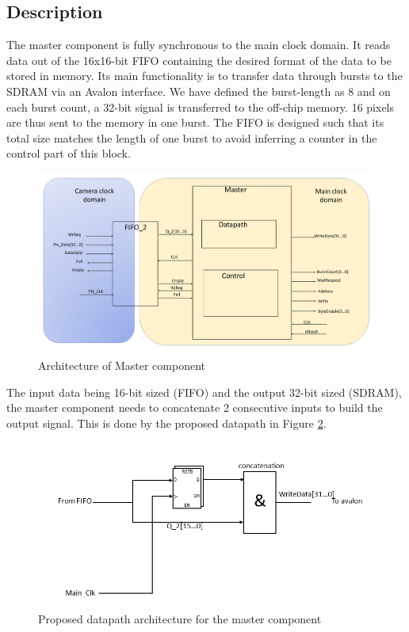 \documentclass{article}
\begin{document}
\subsection{Description}
The master component is fully synchronous to the main clock domain. It reads data out of the 16x16-bit FIFO containing the desired format of the data to be stored in memory. Its main functionality is to transfer data through bursts to the SDRAM via an Avalon interface. We have defined the burst-length as 8 and on each burst count, a 32-bit signal is transferred to the off-chip memory. 16 pixels are thus sent to the memory in one burst. The FIFO is designed such that its total size matches the length of one burst to avoid inferring a counter in the control part of this block. 

\begin{figure}[H]
\centering
\includegraphics[scale=0.23]{master_block_diagram.png}
\caption{Architecture of Master component}
\label{fig:master_block_diagram}
\end{figure}

The input data being 16-bit sized (FIFO) and the output 32-bit sized (SDRAM), the master component needs to concatenate 2 consecutive inputs to build the output signal. This is done by the proposed datapath in Figure \ref{fig:master_datapath}.

\begin{figure}[H]
\centering
\includegraphics{master_datapath.png}
\caption{Proposed datapath architecture for the master component}
\label{fig:master_datapath}
\end{figure}
\end{document}

